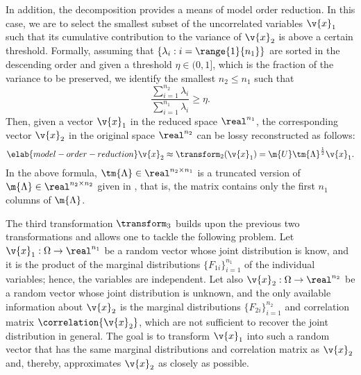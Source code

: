 In addition, the decomposition provides a means of model order reduction. In
this case, we are to select the smallest subset of the uncorrelated variables
$\v{x}_1$ such that its cumulative contribution to the variance of $\v{x}_2$ is
above a certain threshold. Formally, assuming that $\{ \lambda_i: i =
\range{1}{n_1} \}$ are sorted in the descending order and given a threshold
$\eta \in (0, 1]$, which is the fraction of the variance to be preserved, we
identify the smallest $n_2 \leq n_1$ such that
\[
  \frac{\sum_{i = 1}^{n_2} \lambda_i}{\sum_{i = 1}^{n_1} \lambda_i} \geq \eta.
\]
Then, given a vector $\v{x}_1$ in the reduced space $\real^{n_1}$, the
corresponding vector $\v{x}_2$ in the original space $\real^{n_2}$ can be lossy
reconstructed as follows:
\begin{equation} \elab{model-order-reduction}
  \v{x}_2 \approx \transform_2(\v{x}_1) = \m{U} \tm{\Lambda}^\frac{1}{2} \v{x}_1.
\end{equation}
In the above formula, $\tm{\Lambda} \in \real^{n_2 \times n_1}$ is a truncated
version of $\m{\Lambda} \in \real^{n_2 \times n_2}$ given in
, that is, the matrix contains only the first $n_1$
columns of $\m{\Lambda}$.

The third transformation $\transform_3$ builds upon the previous two
transformations and allows one to tackle the following problem. Let $\v{x}_1:
\Omega \to \real^{n_1}$ be a random vector whose joint distribution is know, and
it is the product of the marginal distributions $\{ F_{1i} \}_{i = 1}^{n_1}$ of
the individual variables; hence, the variables are independent. Let also
$\v{x}_2: \Omega \to \real^{n_2}$ be a random vector whose joint distribution is
unknown, and the only available information about $\v{x}_2$ is the marginal
distributions $\{ F_{2i} \}_{i = 1}^{n_2}$ and correlation matrix
$\correlation{\v{x}_2}$, which are not sufficient to recover the joint
distribution in general. The goal is to transform $\v{x}_1$ into such a random
vector that has the same marginal distributions and correlation matrix as
$\v{x}_2$ and, thereby, approximates $\v{x}_2$ as closely as possible.

